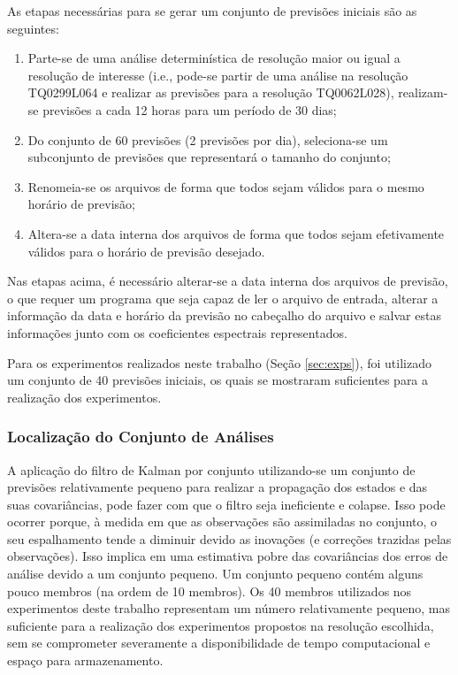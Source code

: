 As etapas necessárias para se gerar um conjunto de previsões iniciais são as seguintes:

\begin{enumerate}
    \item Parte-se de uma análise determinística de resolução maior ou igual a resolução de interesse (i.e., pode-se partir de uma análise na resolução TQ0299L064 e realizar as previsões para a resolução TQ0062L028), realizam-se previsões a cada 12 horas para um período de 30 dias;
    \item Do conjunto de 60 previsões (2 previsões por dia), seleciona-se um subconjunto de previsões que representará o tamanho do conjunto;
    \item Renomeia-se os arquivos de forma que todos sejam válidos para o mesmo horário de previsão;
    \item Altera-se a data interna dos arquivos de forma que todos sejam efetivamente válidos para o horário de previsão desejado.
\end{enumerate}

Nas etapas acima, é necessário alterar-se a data interna dos arquivos de previsão, o que requer um programa que seja capaz de ler o arquivo de entrada, alterar a informação da data e horário da previsão no cabeçalho do arquivo e salvar estas informações junto com os coeficientes espectrais representados.

Para os experimentos realizados neste trabalho (Seção \ref{sec:exps}), foi utilizado um conjunto de 40 previsões iniciais, os quais se mostraram suficientes para a realização dos experimentos.

\subsubsection*{Localização do Conjunto de Análises}

A aplicação do filtro de Kalman por conjunto utilizando-se um conjunto de previsões relativamente pequeno para realizar a propagação dos estados e das suas covariâncias, pode fazer com que o filtro seja ineficiente e colapse. Isso pode ocorrer porque, à medida em que as observações são assimiladas no conjunto, o seu espalhamento tende a diminuir devido as inovações (e correções trazidas pelas observações). Isso implica em uma estimativa pobre das covariâncias dos erros de análise devido a um conjunto pequeno. Um conjunto pequeno contém alguns pouco membros (na ordem de 10 membros). Os 40 membros utilizados nos experimentos deste trabalho representam um número relativamente pequeno, mas suficiente para a realização dos experimentos propostos na resolução escolhida, sem se comprometer severamente a disponibilidade de tempo computacional e espaço para armazenamento.

